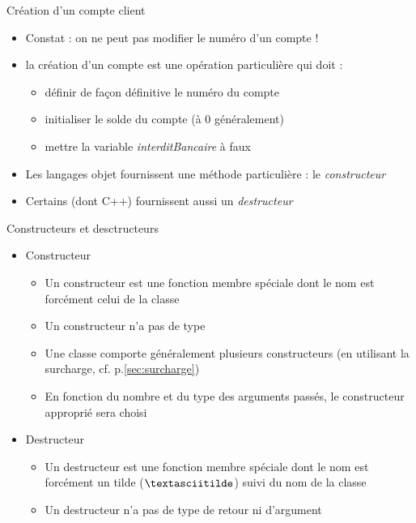 \begin{frame}{Création d'un compte client}
\begin{itemize}
	\item Constat : on ne peut pas modifier le numéro d'un compte !
	\item la création d'un compte est une opération particulière qui doit :

\begin{itemize}
	\item définir de façon définitive le numéro du compte
	\item initialiser le solde du compte (à 0 généralement)
	\item mettre la variable \emph{interditBancaire} à faux
\end{itemize}
\item Les langages objet fournissent une méthode particulière : le \emph{constructeur}
\item Certains (dont C++) fournissent aussi un \emph{destructeur}
\end{itemize}
\end{frame}

\begin{frame}{Constructeurs et desctructeurs}
\begin{itemize}
\item Constructeur
\begin{itemize}
	\item Un constructeur est une fonction membre spéciale dont le nom est forcément celui de la classe
	\item Un constructeur n'a pas de type
	\item Une classe comporte généralement plusieurs constructeurs (en utilisant la surcharge, cf.  p.\ref{sec:surcharge})
	\item En fonction du nombre et du type des arguments passés, le constructeur approprié sera choisi
\end{itemize}
\item Destructeur
\begin{itemize}
\item Un destructeur est une fonction membre spéciale dont le nom est forcément un tilde ($\textasciitilde$) suivi du nom de la classe
\item Un destructeur n'a pas de type de retour ni d'argument
\end{itemize}
\end{itemize}
\end{frame}


